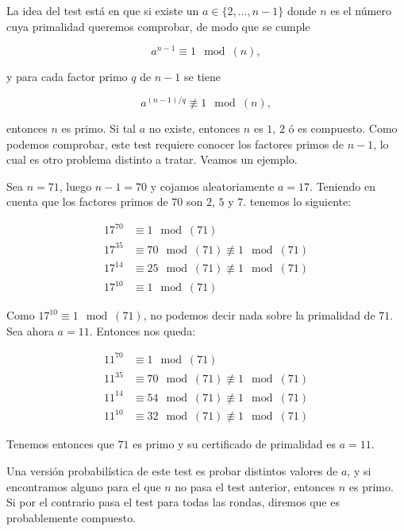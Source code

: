 La idea del test está en que si existe un $a \in \{2,\dotso, n-1\}$ donde $n$ es el número cuya primalidad queremos comprobar, de modo que se cumple

\begin{equation}
a^{n-1} \equiv 1 \mod(n),
\end{equation}

y para cada factor primo $q$ de $n-1$ se tiene

\begin{equation}
a^{(n-1)/q} \not\equiv 1 \mod(n),
\end{equation}

entonces $n$ es primo. Si tal $a$ no existe, entonces $n$ es $1$, $2$ ó es compuesto. Como podemos comprobar, este test requiere conocer los factores primos de $n-1$, lo cual es otro problema distinto a tratar. Veamos un ejemplo.

\begin{ejemplo}
	Sea $n = 71$, luego $n-1 = 70$ y cojamos aleatoriamente $a = 17$. Teniendo en cuenta que los factores primos de $70$ son $2$, $5$ y $7$. tenemos lo siguiente:
	
	\begin{align}
	17^{70} &\equiv 1 \mod(71)\\
	17^{35} &\equiv 70 \mod(71) \not\equiv 1 \mod(71)\\
	17^{14} &\equiv 25 \mod(71) \not\equiv 1 \mod(71)\\
	17^{10} &\equiv 1 \mod(71)
	\end{align}
	
	Como $17^{10} \equiv 1 \mod(71)$, no podemos decir nada sobre la primalidad de $71$. Sea ahora $a = 11$. Entonces nos queda:
	
	\begin{align}
	11^{70} &\equiv 1 \mod(71)\\
	11^{35} &\equiv 70 \mod(71) \not\equiv 1 \mod(71)\\
	11^{14} &\equiv 54 \mod(71) \not\equiv 1 \mod(71)\\
	11^{10} &\equiv 32 \mod(71) \not\equiv 1 \mod(71)
	\end{align}
	
	Tenemos entonces que $71$ es primo y su certificado de primalidad es $a = 11$.
\end{ejemplo}

Una versión probabilística de este test es probar distintos valores de $a$, y si encontramos alguno para el que $n$ no pasa el test anterior, entonces $n$ es primo. Si por el contrario pasa el test para todas las rondas, diremos que es probablemente compuesto.\\

